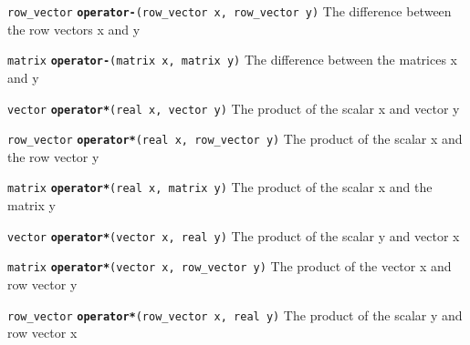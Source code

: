 \documentclass[
  10pt,
]{book}
\begin{document}
\texttt{row\_vector} \textbf{\texttt{operator-}}\texttt{(row\_vector\ x,\ row\_vector\ y)}\newline
The difference between the row vectors x and y


\texttt{matrix} \textbf{\texttt{operator-}}\texttt{(matrix\ x,\ matrix\ y)}\newline
The difference between the matrices x and y


\texttt{vector} \textbf{\texttt{operator*}}\texttt{(real\ x,\ vector\ y)}\newline
The product of the scalar x and vector y


\texttt{row\_vector} \textbf{\texttt{operator*}}\texttt{(real\ x,\ row\_vector\ y)}\newline
The product of the scalar x and the row vector y


\texttt{matrix} \textbf{\texttt{operator*}}\texttt{(real\ x,\ matrix\ y)}\newline
The product of the scalar x and the matrix y


\texttt{vector} \textbf{\texttt{operator*}}\texttt{(vector\ x,\ real\ y)}\newline
The product of the scalar y and vector x


\texttt{matrix} \textbf{\texttt{operator*}}\texttt{(vector\ x,\ row\_vector\ y)}\newline
The product of the vector x and row vector y


\texttt{row\_vector} \textbf{\texttt{operator*}}\texttt{(row\_vector\ x,\ real\ y)}\newline
The product of the scalar y and row vector x
\end{document}
